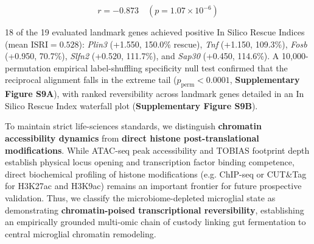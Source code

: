 \documentclass[10pt,a4paper]{article}
\begin{document}
\begin{equation}
r = \mathbf{-0.873} \quad (p = 1.07 \times 10^{-6})
\end{equation}

18 of the 19 evaluated landmark genes achieved positive In Silico Rescue Indices (mean $\text{ISRI} = 0.528$): \textit{Plin3} (+1.550, 150.0\% rescue), \textit{Tnf} (+1.150, 109.3\%), \textit{Fosb} (+0.950, 70.7\%), \textit{Slfn2} (+0.520, 111.7\%), and \textit{Sap30} (+0.450, 114.6\%). A 10,000-permutation empirical label-shuffling specificity null test confirmed that the reciprocal alignment falls in the extreme tail ($p_{\text{perm}} < 0.0001$, \textbf{Supplementary Figure S9A}), with ranked reversibility across landmark genes detailed in an In Silico Rescue Index waterfall plot (\textbf{Supplementary Figure S9B}).

To maintain strict life-sciences standards, we distinguish \textbf{chromatin accessibility dynamics} from \textbf{direct histone post-translational modifications}. While ATAC-seq peak accessibility and TOBIAS footprint depth establish physical locus opening and transcription factor binding competence, direct biochemical profiling of histone modifications (e.g. ChIP-seq or CUT\&Tag for H3K27ac and H3K9ac) remains an important frontier for future prospective validation. Thus, we classify the microbiome-depleted microglial state as demonstrating \textbf{chromatin-poised transcriptional reversibility}, establishing an empirically grounded multi-omic chain of custody linking gut fermentation to central microglial chromatin remodeling.
\end{document}
